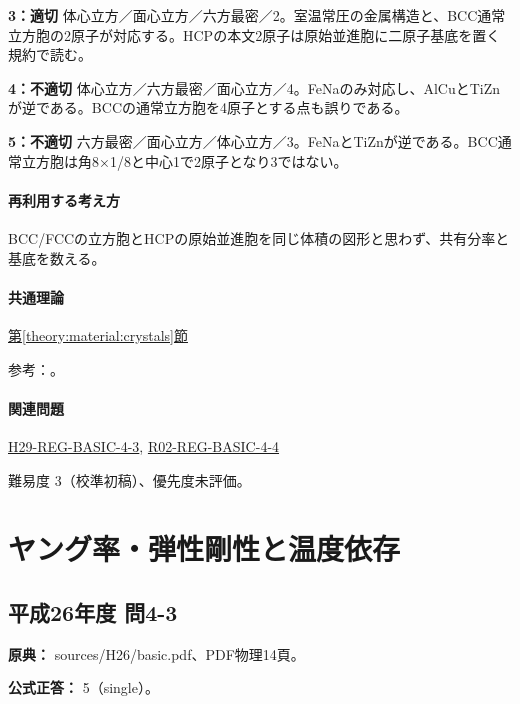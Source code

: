 \noindent\textbf{3：適切} 体心立方／面心立方／六方最密／2。室温常圧の金属構造と、BCC通常立方胞の2原子が対応する。HCPの本文2原子は原始並進胞に二原子基底を置く規約で読む。\par

\noindent\textbf{4：不適切} 体心立方／六方最密／面心立方／4。FeNaのみ対応し、AlCuとTiZnが逆である。BCCの通常立方胞を4原子とする点も誤りである。\par

\noindent\textbf{5：不適切} 六方最密／面心立方／体心立方／3。FeNaとTiZnが逆である。BCC通常立方胞は角8×1/8と中心1で2原子となり3ではない。\par

\paragraph{再利用する考え方} BCC/FCCの立方胞とHCPの原始並進胞を同じ体積の図形と思わず、共有分率と基底を数える。

\paragraph{共通理論} \hyperref[theory:material:crystals]{第\ref*{theory:material:crystals}節}

\par 参考：\cite{cambridge_unitcell,princeton_hcp,princeton_iron,princeton_aluminum,princeton_copper,princeton_sodium,princeton_titanium,princeton_zinc}。

\paragraph{関連問題} \hyperref[q:h29-reg-basic-4-3]{H29-REG-BASIC-4-3}, \hyperref[q:r02-reg-basic-4-4]{R02-REG-BASIC-4-4}

\par 難易度 3（校準初稿）、優先度未評価。

\section{ヤング率・弾性剛性と温度依存}

\subsection{平成26年度 問4-3}
\label{q:h26-reg-basic-4-3}

\noindent\textbf{原典：} sources/H26/basic.pdf、PDF物理14頁。

\textbf{公式正答：} 5（single）。


